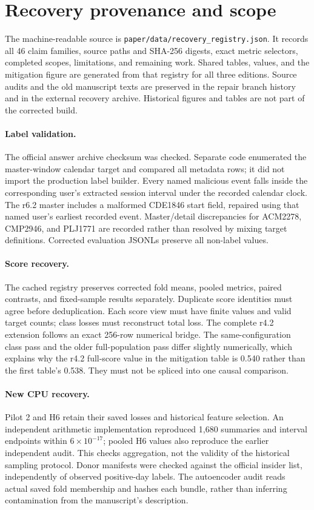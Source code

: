 \section{Recovery provenance and scope}
\label{app:provenance}
The machine-readable source is \texttt{paper/data/recovery\_registry.json}.
It records all 46 claim families, source paths and SHA-256 digests, exact metric
selectors, completed scopes, limitations, and remaining work. Shared tables,
values, and the mitigation figure are generated from that registry for all
three editions. Source audits and the old manuscript texts are preserved in the
repair branch history and in the external recovery archive. Historical figures
and tables are not part of the corrected build.

\paragraph{Label validation.}
The official answer archive checksum was checked. Separate code enumerated the
master-window calendar target and compared all metadata rows; it did not import
the production label builder. Every named malicious event falls inside the
corresponding user's extracted session interval under the recorded calendar
clock. The r6.2 master includes a malformed CDE1846 start field, repaired using
that named user's earliest recorded event. Master/detail discrepancies for
ACM2278, CMP2946, and PLJ1771 are recorded rather than resolved by mixing target
definitions. Corrected evaluation JSONLs preserve all non-label values.

\paragraph{Score recovery.}
The cached registry preserves corrected fold means, pooled metrics, paired
contrasts, and fixed-sample results separately. Duplicate score identities must
agree before deduplication. Each score view must have finite values and valid
target counts; class losses must reconstruct total loss. The complete r4.2
extension follows an exact 256-row numerical bridge. The same-configuration
class pass and the older full-population pass differ slightly numerically, which
explains why the r4.2 full-score value in the mitigation table is 0.540 rather
than the first table's 0.538. They must not be spliced into one causal comparison.

\paragraph{New CPU recovery.}
Pilot 2 and H6 retain their saved losses and historical feature selection. An
independent arithmetic implementation reproduced 1,680 summaries and interval
endpoints within $6\times10^{-17}$; pooled H6 values also reproduce the earlier
independent audit. This checks aggregation, not the validity of the historical
sampling protocol. Donor manifests were checked against the official insider
list, independently of observed positive-day labels. The autoencoder audit reads
actual saved fold membership and hashes each bundle, rather than inferring
contamination from the manuscript's description.

